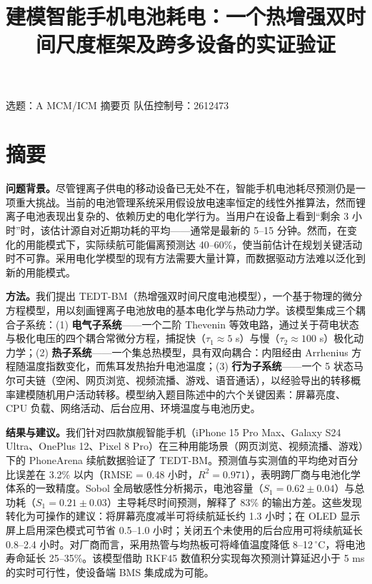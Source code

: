 \documentclass[11pt,a4paper]{ctexart}
\title{建模智能手机电池耗电：一个热增强双时间尺度框架及跨多设备的实证验证}
\author{}
\date{}
\begin{document}
\maketitle

\begin{center}
\small 选题：A  MCM/ICM 摘要页 \quad 队伍控制号：2612473
\end{center}
\vspace{0.5em}

\section*{摘要}

\textbf{问题背景。}尽管锂离子供电的移动设备已无处不在，智能手机电池耗尽预测仍是一项重大挑战。当前的电池管理系统采用假设放电速率恒定的线性外推算法，然而锂离子电池表现出复杂的、依赖历史的电化学行为。当用户在设备上看到“剩余 3 小时”时，该估计源自对近期功耗的平均——通常是最新的 5--15 分钟。然而，在变化的用能模式下，实际续航可能偏离预测达 40--60\%，使当前估计在规划关键活动时不可靠。采用电化学模型的现有方法需要大量计算，而数据驱动方法难以泛化到新的用能模式。

\textbf{方法。}我们提出 TEDT-BM（热增强双时间尺度电池模型），一个基于物理的微分方程模型，用以刻画锂离子电池放电的基本电化学与热动力学。该模型集成三个耦合子系统：(1) \textbf{电气子系统}——一个二阶 Thevenin 等效电路，通过关于荷电状态与极化电压的四个耦合常微分方程，捕捉快（$\tau_1 \approx 5$ s）与慢（$\tau_2 \approx 100$ s）极化动力学；(2) \textbf{热子系统}——一个集总热模型，具有双向耦合：内阻经由 Arrhenius 方程随温度指数变化，而焦耳发热抬升电池温度；(3) \textbf{行为子系统}——一个 5 状态马尔可夫链（空闲、网页浏览、视频流播、游戏、语音通话），以经验导出的转移概率建模随机用户活动转移。模型纳入题目陈述中的六个关键因素：屏幕亮度、CPU 负载、网络活动、后台应用、环境温度与电池历史。

\textbf{结果与建议。}我们针对四款旗舰智能手机（iPhone 15 Pro Max、Galaxy S24 Ultra、OnePlus 12、Pixel 8 Pro）在三种用能场景（网页浏览、视频流播、游戏）下的 PhoneArena 续航数据验证了 TEDT-BM。预测值与实测值的平均绝对百分比误差在 3.2\% 以内（RMSE = 0.48 小时，$R^2 = 0.971$），表明跨厂商与电池化学体系的一致精度。Sobol 全局敏感性分析揭示，电池容量（$S_1 = 0.62 \pm 0.04$）与总功耗（$S_1 = 0.21 \pm 0.03$）主导耗尽时间预测，解释了 83\% 的输出方差。这些发现转化为可操作的建议：将屏幕亮度减半可将续航延长约 1.3 小时；在 OLED 显示屏上启用深色模式可节省 0.5--1.0 小时；关闭五个未使用的后台应用可将续航延长 0.8--2.4 小时。对厂商而言，采用热管与均热板可将峰值温度降低 8--12\,$^{\circ}$C，将电池寿命延长 25--35\%。该模型借助 RKF45 数值积分实现每次预测计算延迟小于 5 ms 的实时可行性，使设备端 BMS 集成成为可能。
\end{document}
